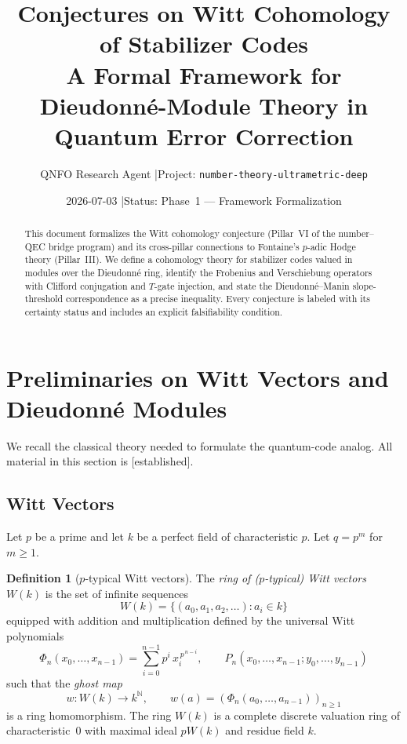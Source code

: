 \documentclass[12pt]{article}
\title{\textbf{Conjectures on Witt Cohomology of Stabilizer Codes}\\[6pt]
\large A Formal Framework for Dieudonn\'{e}-Module Theory in\\Quantum Error Correction}
\author{QNFO Research Agent \quad|\quad Project: \texttt{number-theory-ultrametric-deep}}
\date{2026-07-03 \quad|\quad Status: Phase~1 — Framework Formalization}
\theoremstyle{definition}
\newtheorem{definition}{Definition}[section]
\theoremstyle{plain}
\theoremstyle{remark}
\newcommand{\established}{{\color{green!50!black}[\textsf{established}]}}
\begin{document}
\maketitle

\begin{abstract}
This document formalizes the Witt cohomology conjecture (Pillar~VI of the number--QEC bridge program) and its cross-pillar connections to Fontaine's $p$-adic Hodge theory (Pillar~III). We define a cohomology theory for stabilizer codes valued in modules over the Dieudonn\'{e} ring, identify the Frobenius and Verschiebung operators with Clifford conjugation and $T$-gate injection, and state the Dieudonn\'{e}--Manin slope-threshold correspondence as a precise inequality. Every conjecture is labeled with its certainty status and includes an explicit falsifiability condition.
\end{abstract}

\tableofcontents

\section{Preliminaries on Witt Vectors and Dieudonn\'{e} Modules}

We recall the classical theory needed to formulate the quantum-code analog. All material in this section is \established.

\subsection{Witt Vectors}

Let $p$ be a prime and let $k$ be a perfect field of characteristic $p$. Let $q=p^m$ for $m\geq 1$.

\begin{definition}[$p$-typical Witt vectors]
The \emph{ring of ($p$-typical) Witt vectors} $W(k)$ is the set of infinite sequences
\[
W(k)=\{(a_0,a_1,a_2,\dots):a_i\in k\}
\]
equipped with addition and multiplication defined by the universal Witt polynomials
\[
\Phi_n(x_0,\dots,x_{n-1})=\sum_{i=0}^{n-1}p^i\,x_i^{\,p^{\,n-i}},
\qquad
P_n(x_0,\dots,x_{n-1};y_0,\dots,y_{n-1})
\]
such that the \emph{ghost map}
\[
w:W(k)\longrightarrow k^{\mathbb{N}},\qquad
w(a)=(\Phi_n(a_0,\dots,a_{n-1}))_{n\geq1}
\]
is a ring homomorphism. The ring $W(k)$ is a complete discrete valuation ring of characteristic~0 with maximal ideal $pW(k)$ and residue field $k$.
\end{definition}
\end{document}
